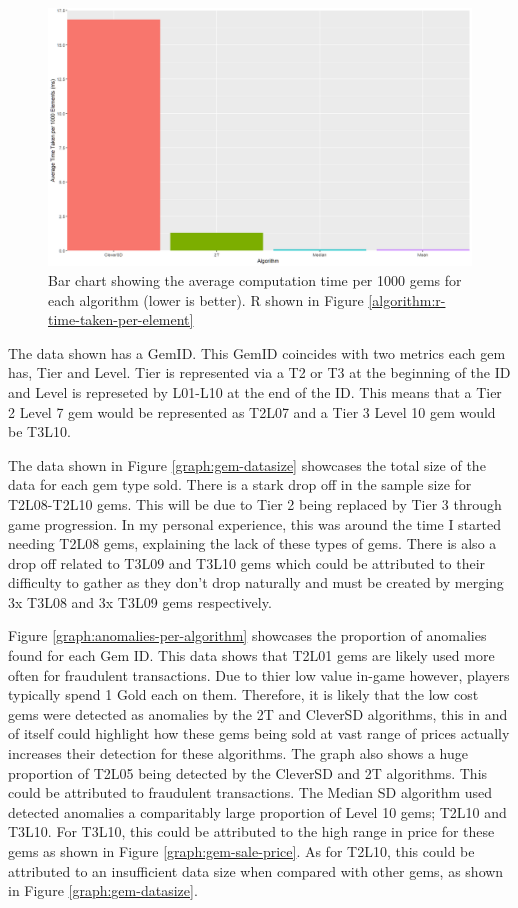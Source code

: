 \documentclass[journal]{IEEEtran}
\begin{document}
\begin{figure}[t]
    \centering
    \includegraphics[width=12cm]{graph-compute-time-per-algorithm.png}
    \caption{Bar chart showing the average computation time per 1000 gems for each algorithm (lower is better). R shown in Figure \ref{algorithm:r-time-taken-per-element}}
    \label{graph:time-taken-per-algorithm}
\end{figure}

\noindent The data shown has a GemID. This GemID coincides with two metrics each gem has, Tier and Level. Tier is represented via a T2 or T3 at the beginning of the ID and Level is represeted by L01-L10 at the end of the ID. This means that a Tier 2 Level 7 gem would be represented as T2L07 and a Tier 3 Level 10 gem would be T3L10. 

The data shown in Figure \ref{graph:gem-datasize} showcases the total size of the data for each gem type sold. There is a stark drop off in the sample size for T2L08-T2L10 gems. This will be due to Tier 2 being replaced by Tier 3 through game progression. In my personal experience, this was around the time I started needing T2L08 gems, explaining the lack of these types of gems. There is also a drop off related to T3L09 and T3L10 gems which could be attributed to their difficulty to gather as they don't drop naturally and must be created by merging 3x T3L08 and 3x T3L09 gems respectively.

Figure \ref{graph:anomalies-per-algorithm} showcases the proportion of anomalies found for each Gem ID. This data shows that T2L01 gems are likely used more often for fraudulent transactions. Due to thier low value in-game however, players typically spend 1 Gold each on them. Therefore, it is likely that the low cost gems were detected as anomalies by the 2T and CleverSD algorithms, this in and of itself could highlight how these gems being sold at vast range of prices actually increases their detection for these algorithms.
The graph also shows a huge proportion of T2L05 being detected by the CleverSD and 2T algorithms. This could be attributed to fraudulent transactions.
The Median SD algorithm used detected anomalies a comparitably large proportion of Level 10 gems; T2L10 and T3L10. For T3L10, this could be attributed to the high range in price for these gems as shown in Figure \ref{graph:gem-sale-price}. As for T2L10, this could be attributed to an insufficient data size when compared with other gems, as shown in Figure \ref{graph:gem-datasize}.
\end{document}
